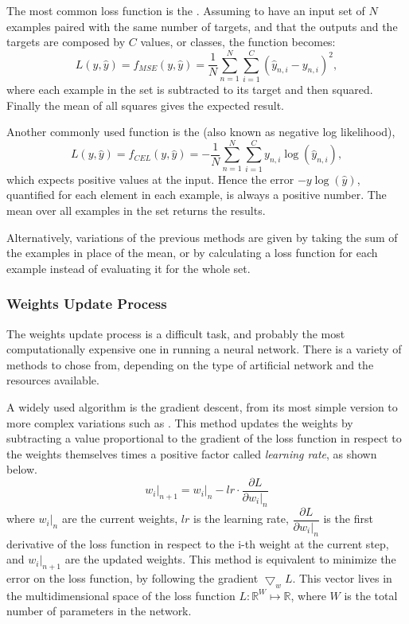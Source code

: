 The most common loss function is the .
Assuming to have an input set of $N$ examples paired with the same number of targets, and that the outputs and the targets are composed by $C$ values, or classes, the function becomes:
\begin{equation}
	L(y, \hat{y}) = f_{MSE}(y, \hat{y}) = \frac{1}{N} \sum_{n=1}^N \sum_{i=1}^C \left( \hat{y}_{n,i} - y_{n,i} \right)^2,
\end{equation}
where each example in the set is subtracted to its target and then squared.
Finally the mean of all squares gives the expected result.

Another commonly used function is the  (also known as negative log likelihood),
\begin{equation}
	L(y, \hat{y}) = f_{CEL}(y, \hat{y}) = - \frac{1}{N} \sum_{n=1}^N \sum_{i=1}^C y_{n,i} \log \left( \hat{y}_{n,i} \right),
\end{equation}
which expects positive values at the input.
Hence the error $-y\log \left( \hat{y} \right)$, quantified for each element in each example, is always a positive number.
The mean over all examples in the set returns the results.

Alternatively, variations of the previous methods are given by taking the sum of the examples in place of the mean, or by calculating a loss function for each example instead of evaluating it for the whole set.

\subsubsection{Weights Update Process}
\label{sssec:Weights_Update_Process}

The weights update process is a difficult task, and probably the most computationally expensive one in running a neural network.
There is a variety of methods to chose from, depending on the type of artificial network and the resources available.

A widely used algorithm is the gradient descent, from its most simple version to more complex variations such as .
This method updates the weights by subtracting a value proportional to the gradient of the loss function in respect to the weights themselves times a positive factor called \textit{learning rate}, as shown below.
\begin{equation}
	\left.w_i\right|_{n+1} = \left.w_i\right|_n - lr \cdot \frac{\partial L}{\partial \left.w_i\right|_n}
\end{equation}
where $\left.w_i\right|_{n}$ are the current weights, $lr$ is the learning rate, $\dfrac{\partial L}{\partial \left.w_i\right|_n}$ is the first derivative of the loss function in respect to the i-th weight at the current step, and $\left.w_i\right|_{n+1}$ are the updated weights.
This method is equivalent to minimize the error on the loss function, by following the gradient $\bigtriangledown_w L$.
This vector lives in the multidimensional space of the loss function $L:\mathbb{R}^W \mapsto \mathbb{R}$, where $W$ is the total number of parameters in the network.

